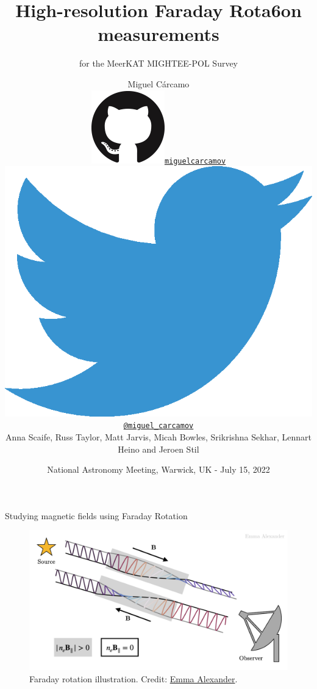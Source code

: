 \documentclass[xetex,aspectratio=169]{beamer}
\date{National Astronomy Meeting, Warwick, UK - July 15, 2022}
\title
    {High-resolution Faraday Rota6on measurements}
\subtitle
    { for the MeerKAT MIGHTEE-POL Survey}
\author
    {Miguel C\'arcamo\\
    \includegraphics[scale=0.08]{figures/logos/GitHub-Mark-120px-plus.png}\hspace{0.05cm}\href{https://www.github.com/miguelcarcamov}{\tt miguelcarcamov}\\
    \includegraphics[scale=0.05]{figures/logos/2021 Twitter logo - blue.eps}\hspace{0.05cm}\href{https://www.twitter.com/miguel_carcamov}{\tt @miguel\_carcamov}\\
    \vspace{0.5cm}
    Anna Scaife, Russ Taylor, Matt Jarvis, Micah Bowles, Srikrishna Sekhar, Lennart Heino and Jeroen Stil\\
    }
\begin{document}
\frame[plain]{\titlepage}



\begin{frame}{Studying magnetic fields using Faraday Rotation}
	\begin{figure}
		\centering
		\includegraphics[width=.8\textwidth]{figures/faraday_rot.png}
		\caption*{Faraday rotation illustration. Credit: \href{https://emmaalexander.github.io/resources.html}{Emma Alexander}.}
	\end{figure}
\end{frame}
\end{document}
